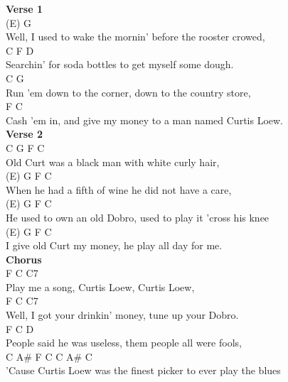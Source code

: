 \documentclass[a4paper]{article}
\begin{document}
    {
        \scriptsize
        \textbf{Verse 1}
        ~\\
        {
            \cutive
            \obeyspaces
        (E)                      G       
\\
Well, I used to wake the mornin' before the rooster crowed,
\\
C                             F               D
\\
Searchin' for soda bottles to get myself some dough.
\\
C                           G       
\\
Run 'em down to the corner, down to the country store,
\\
F                                                    C
\\
Cash 'em in, and give my money to a man named Curtis Loew.
\\

        }
        \textbf{Verse 2}
        ~\\
        {
            \cutive
            \obeyspaces
C              G              F           C
\\
Old Curt was a black man with white curly hair,
\\
(E)                    G           F          C 
\\
When he had a fifth of wine he did not have a care,
\\
(E)                   G              F                  C 
\\
He used to own an old Dobro, used to play it 'cross his knee
\\
(E)                G         F                C
\\
I give old Curt my money, he play all day for me.
\\

        }
        \textbf{Chorus}
        ~\\
        {
            \cutive
            \obeyspaces
  F                     C            C7 
\\
Play me a song, Curtis Loew, Curtis Loew,
\\
  F                                C           C7
\\
Well, I got your drinkin' money, tune up your Dobro.
\\
  F                                C             D
\\
People said he was useless, them people all were fools,
\\
        C                  A\#                F             C       C   A\#   C
\\
'Cause Curtis Loew was the finest picker to ever play the blues
\\

}}
\end{document}
